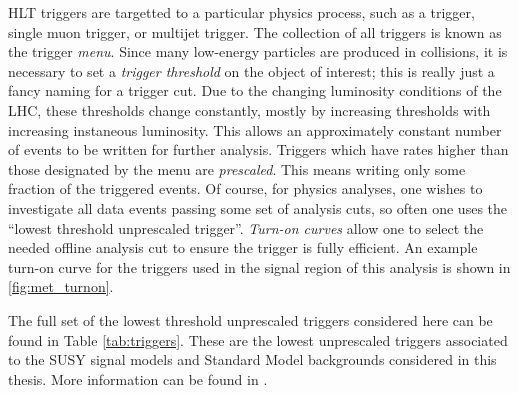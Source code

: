 HLT triggers are targetted to a particular physics process, such as a \met trigger, single muon trigger, or multijet trigger.
The collection of all triggers is known as the trigger \textit{menu}.
Since many low-energy particles are produced in collisions, it is necessary to set a \textit{trigger threshold} on the object of interest; this is really just a fancy naming for a trigger \pt cut.
Due to the changing luminosity conditions of the LHC, these thresholds change constantly, mostly by increasing thresholds with increasing instaneous luminosity.
This allows an approximately constant number of events to be written for further analysis.
Triggers which have rates higher than those designated by the menu are \textit{prescaled}.
This means writing only some fraction of the triggered events.
Of course, for physics analyses, one wishes to investigate all data events passing some set of analysis cuts, so often one uses the ``lowest threshold unprescaled trigger''.
\textit{Turn-on curves} allow one to select the needed offline analysis cut to ensure the trigger is fully efficient.
An example turn-on curve for the \met triggers used in the signal region of this analysis is shown in \ref{fig:met_turnon}.

The full set of the lowest threshold unprescaled triggers considered here can be found in Table \ref{tab:triggers}.
These are the lowest unprescaled triggers associated to the SUSY signal models and Standard Model backgrounds considered in this thesis.
More information can be found in \cite{ATL-DAQ-PUB-2016-001}.


